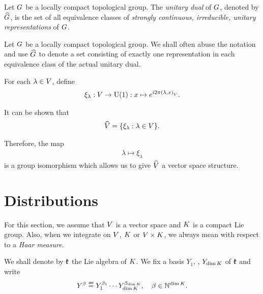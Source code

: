 \begin{definition}
\label{definition:unitary_dual}
    Let $G$ be a locally compact topological group.
    The \emph{unitary dual} of $G$, denoted by ${\widehat{G}}$,
    is the set of all equivalence classes of
    \emph{strongly continuous, irreducible, unitary representations} of $G$.
\end{definition}

\begin{remark}
    Let $G$ be a locally compact topological group.
    We shall often abuse the notation and use ${\widehat{G}}$ to denote a set consisting of
    exactly one representation in each equivalence class of the actual unitary dual.
\end{remark}

\begin{example}[$\dualGroup\VectorSpace$]
    For each $\lambda \in V$,
    define
    \begin{align}
        \xi_\lambda : V \to {\mathrm{U} (1)} : x \mapsto e^{i 2 \pi {\left(\lambda, x\right)_{V}}}.
        \label{eq:elements_of_dual_of_vector_space}
    \end{align}

    It can be shown that
    \begin{align*}
        {\widehat{V}} = \{ \xi_\lambda : \lambda \in V \}.
    \end{align*}

    Therefore, the map
    \begin{align}
        \lambda \mapsto \xi_\lambda
        \label{eq:isomorphism_between_vector_space_and_its_dual_group}
    \end{align}
    is a group isomorphism which allows us to give $\dualGroup\VectorSpace$ a vector space structure.
\end{example}

\section{Distributions}

For this section,
we assume that $V$ is a vector space
and $K$ is a compact Lie group.
Also, when we integrate on $V$, $K$ or $V \times K$,
we always mean with respect to a \emph{Haar measure}.

We shall denote by $\mathfrak{k}$ the Lie algebra of $K$.
We fix a basis $Y_1$, \cdots, $Y_{\dim K}$ of $\mathfrak{k}$ and write
\begin{align*}
    Y^\beta \defeq Y_1^{\beta_1} \cdots Y_{\dim \CompactGroup}^{\beta_{\dim \CompactGroup}},
    \quad \beta \in \N^{\dim \CompactGroup}.
\end{align*}

